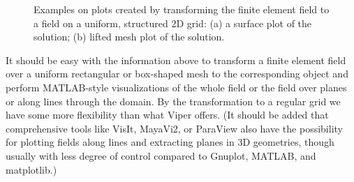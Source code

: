 \begin{figure}
  \centering
  \caption{Examples on plots created by transforming the finite
    element field to a field on a uniform, structured 2D grid: (a) a
    surface plot of the solution; (b) lifted mesh plot of the
  solution.}
  \label{langtangen:poisson:2D:fig3}
\end{figure}

It should be easy with the information above to transform a finite element
field over a uniform rectangular or box-shaped mesh to the corresponding
 object and perform MATLAB-style
visualizations of the whole field or
the field over planes or along lines through the domain.
By the transformation to a regular grid we have some more flexibility
than what Viper offers. (It should be added that
comprehensive tools like
VisIt, MayaVi2, or ParaView also have the possibility for plotting fields
along lines and extracting planes in 3D geometries, though usually with
less degree of control compared to Gnuplot, MATLAB, and matplotlib.)

